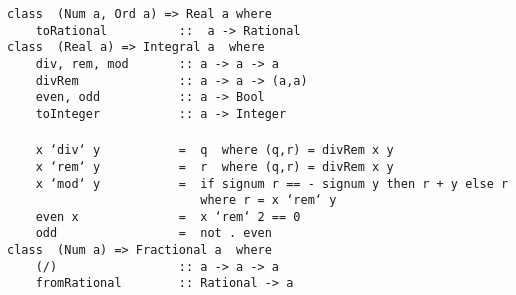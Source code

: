 %
%
%
%
%
%
%
%
%
%
\eprogB\noindent\bprogB
\mbox{\tt class\ \ (Num\ a,\ Ord\ a)\ =>\ Real\ a\ where}\\
\mbox{\tt \ \ \ \ toRational\ \ \ \ \ \ \ \ \ \ ::\ \ a\ ->\ Rational}
%
%
%
%
\eprogB\noindent\bprogB
\mbox{\tt class\ \ (Real\ a)\ =>\ Integral\ a\ \ where}\\
\mbox{\tt \ \ \ \ div,\ rem,\ mod\ \ \ \ \ \ \ ::\ a\ ->\ a\ ->\ a}\\
\mbox{\tt \ \ \ \ divRem\ \ \ \ \ \ \ \ \ \ \ \ \ \ ::\ a\ ->\ a\ ->\ (a,a)}\\
\mbox{\tt \ \ \ \ even,\ odd\ \ \ \ \ \ \ \ \ \ \ ::\ a\ ->\ Bool}\\
\mbox{\tt \ \ \ \ toInteger\ \ \ \ \ \ \ \ \ \ \ ::\ a\ ->\ Integer}\\
\mbox{\tt }\\[-8pt]
\mbox{\tt \ \ \ \ x\ `div`\ y\ \ \ \ \ \ \ \ \ \ \ =\ \ q\ \ where\ (q,r)\ =\ divRem\ x\ y}\\
\mbox{\tt \ \ \ \ x\ `rem`\ y\ \ \ \ \ \ \ \ \ \ \ =\ \ r\ \ where\ (q,r)\ =\ divRem\ x\ y}\\
\mbox{\tt \ \ \ \ x\ `mod`\ y\ \ \ \ \ \ \ \ \ \ \ =\ \ if\ signum\ r\ ==\ -\ signum\ y\ then\ r\ +\ y\ else\ r}\\
\mbox{\tt \ \ \ \ \ \ \ \ \ \ \ \ \ \ \ \ \ \ \ \ \ \ \ \ \ \ \ where\ r\ =\ x\ `rem`\ y}\\
\mbox{\tt \ \ \ \ even\ x\ \ \ \ \ \ \ \ \ \ \ \ \ \ =\ \ x\ `rem`\ 2\ ==\ 0}\\
\mbox{\tt \ \ \ \ odd\ \ \ \ \ \ \ \ \ \ \ \ \ \ \ \ \ =\ \ not\ .\ even}
%
%
%
%
%
%
%
%
%
\eprogB\noindent\bprogB
\mbox{\tt class\ \ (Num\ a)\ =>\ Fractional\ a\ \ where}\\
\mbox{\tt \ \ \ \ (/)\ \ \ \ \ \ \ \ \ \ \ \ \ \ \ \ \ ::\ a\ ->\ a\ ->\ a}\\
\mbox{\tt \ \ \ \ fromRational\ \ \ \ \ \ \ \ ::\ Rational\ ->\ a}
%
%
%
%
\eprogB\noindent\bprogB
